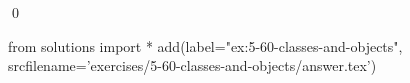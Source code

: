 
\begin{ex}
  \label{ex:5-60-classes-and-objects}
  
  \qed
\end{ex}
\begin{python0}
from solutions import *
add(label="ex:5-60-classes-and-objects",
    srcfilename='exercises/5-60-classes-and-objects/answer.tex')
\end{python0}
